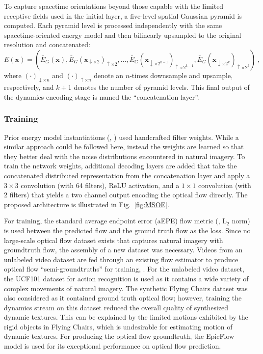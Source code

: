 To capture spacetime orientations beyond those capable
with the limited receptive fields used in the initial
layer, a five-level spatial Gaussian pyramid is computed.
Each pyramid level is processed independently
with the same spacetime-oriented energy model and then
bilinearly upsampled to the original resolution and
concatenated:
\begin{equation}
	E(\mathbf{x}) = \left( \bar{E}_G(\mathbf{x}) , \bar{E}_G(\mathbf{x}_{\downarrow\times2})_{\uparrow\times2} , \dots , \bar{E}_G(\mathbf{x}_{\downarrow\times2^{k-1}})_{\uparrow\times2^{k-1}} , \bar{E}_G(\mathbf{x}_{\downarrow\times2^k})_{\uparrow\times2^k} \right)\ ,
\end{equation}
where $(\cdot)_{\downarrow \times n}$ and $(\cdot)_{\uparrow \times n}$ denote an $n$-times downsample and upsample, respectively, and $k+1$ denotes the number of pyramid levels. This final output of the dynamics encoding stage is named the ``concatenation layer''.

\subsubsection{Training}

Prior energy model instantiations (\eg,
\cite{adelson1985spatiotemporal,derpanis2012spacetime,simoncelli1998})
used handcrafted filter weights.
While a similar approach could be followed here, instead the weights
are learned so that they better deal with the noise distributions encountered in natural imagery.
To train the network weights, additional decoding
layers are added that take the concatenated distributed
representation from the concatenation layer and apply a $3\times 3$ convolution
(with 64 filters), ReLU activation, and a $1\times 1$
convolution (with 2 filters) that yields a two channel
output encoding the optical flow directly.
The proposed architecture is illustrated in
Fig.\ \ref{fig:MSOE}.



For training, the standard average
endpoint error (aEPE) flow metric (\ie, $\text{L}_2$
norm) is used between the predicted flow and the ground truth
flow as the loss.
Since no large-scale optical flow dataset exists that captures
natural imagery with groundtruth flow, the assembly of a new dataset was necessary. Videos
from an unlabeled video dataset are fed through an existing flow
estimator to produce optical
flow ``semi-groundtruths'' for training,
\cf \cite{tran2016}.
For the unlabeled video dataset, the UCF101
dataset for action recognition \cite{soomro2012ucf101} is used as it contains a wide variety of complex movements of natural imagery. The synthetic Flying Chairs dataset \cite{dosovitskiy2015} was also considered as it contained ground truth optical flow; however, training the dynamics stream on this dataset reduced the overall quality of synthesized dynamic textures. This can be explained by the limited motions exhibited by the rigid objects in Flying Chairs, which is undesirable for estimating motion of dynamic textures.
For producing the optical flow groundtruth, the EpicFlow \cite{revaud2015epicflow} model is used for 
its exceptional performance on optical flow prediction.

